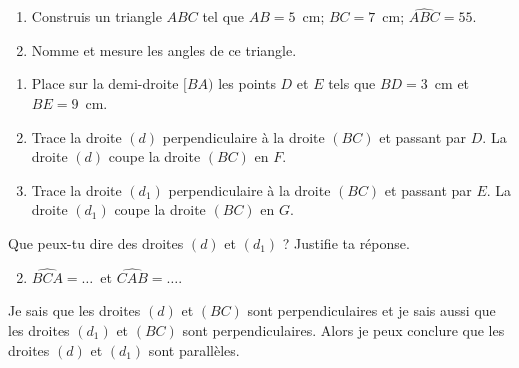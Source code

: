 \begin{myenumerate}
\item
\begin{enumerate}
\item Construis un triangle $ABC$ tel que $AB=5$~cm; $BC=7$~cm;
$\widehat{ABC}=55$\degres.
\item Nomme et mesure les angles de ce triangle.
\end{enumerate}
\item
\begin{enumerate}
\item Place sur la demi-droite $[BA)$ les points $D$ et $E$ tels que
$BD=3$~cm et $BE=9$~cm.
\item Trace la droite $(d)$ perpendiculaire à la droite $(BC)$ et
passant par $D$. La droite $(d)$ coupe la droite $(BC)$ en $F$.
\item Trace la droite $(d_1)$ perpendiculaire à la droite $(BC)$ et
  passant par $E$. La droite $(d_1)$ coupe la droite $(BC)$ en $G$.
\end{enumerate}
\item Que peux-tu dire des droites $(d)$ et $(d_1)$ ? Justifie ta
réponse.
\end{myenumerate}
\begin{myenumerate}
  \item
    \begin{enumerate}
      \setcounter{enumii}{1}
    \item $\widehat{BCA}=\ldots$\degres\ et $\widehat{CAB}=\ldots$\degres.
    \end{enumerate}
  \setcounter{enumi}{2}
  \item Je sais que les droites $(d)$ et $(BC)$ sont perpendiculaires
    et je sais aussi que les droites $(d_1)$ et $(BC)$ sont
    perpendiculaires. Alors je peux conclure que les droites $(d)$ et
    $(d_1)$ sont parallèles.
\end{myenumerate}